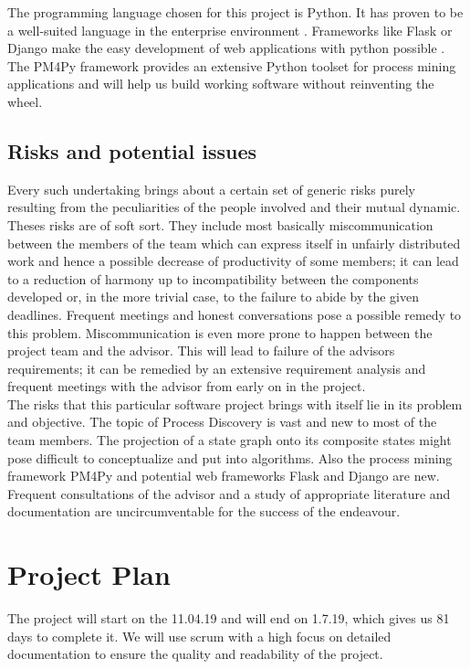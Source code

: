 \documentclass[12pt]{extarticle}
\begin{document}
The programming language chosen for this project is Python. It has proven to be a well-suited language in the enterprise environment \cite{danjou}. Frameworks like Flask or Django make the easy development of web applications with python possible \cite{framework}. The PM4Py framework provides an extensive Python toolset for process mining applications and will help us build working software without reinventing the wheel.

\subsection{Risks and potential issues}

Every such undertaking brings about a certain set of generic risks purely resulting from the peculiarities of the people involved and their mutual dynamic. Theses risks are of soft sort. They include most basically miscommunication between the members of the team which can express itself in unfairly distributed work and hence a possible decrease of productivity of some members; it can lead to a reduction of harmony up to incompatibility between the components developed or, in the more trivial case, to the failure to abide by the given deadlines. Frequent meetings and honest conversations pose a possible remedy to this problem. Miscommunication is even more prone to happen between the project team and the advisor. This will lead to failure of the advisors requirements; it can be remedied by an extensive requirement analysis and frequent meetings with the advisor from early on in the project.\\
The risks that this particular software project brings with itself lie in its problem and objective. The topic of Process Discovery is vast and new to most of the team members. The projection of a state graph onto its composite states might pose difficult to conceptualize and put into algorithms. Also the process mining framework PM4Py and potential web frameworks Flask and Django are new. Frequent consultations of the advisor and a study of appropriate literature and documentation are uncircumventable for the success of the endeavour.

\section{Project Plan}
The project will start on the 11.04.19 and will end on 1.7.19, which gives us 81 days to complete it. We will use scrum with a high focus on detailed documentation to ensure the quality and readability of the project.
\end{document}
